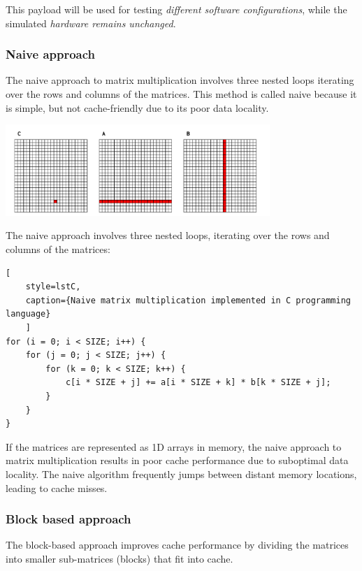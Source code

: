 \noindent This payload will be used for testing \textit{different software configurations}, while the simulated \textit{hardware remains unchanged}.

\subsubsection*{Naive approach} \label{sec:mmnaive}
The naive approach to matrix multiplication involves three nested loops iterating over the rows and columns of the matrices. This method is called naive because it is simple, but not cache-friendly
due to its poor data locality.

\begin{center}
	\centering
	\includegraphics[width=0.75\textwidth]{figures/05-analysis/mm_naive.pdf}
	\label{fig:mm_naive}
\end{center}

The naive approach involves three nested loops, iterating over the rows and columns of the matrices:

\begin{center}
\centering
\begin{minipage}{\linewidth}
\begin{lstlisting}[
	style=lstC,
    caption={Naive matrix multiplication implemented in C programming language}
    ]
for (i = 0; i < SIZE; i++) {
	for (j = 0; j < SIZE; j++) {
		for (k = 0; k < SIZE; k++) {
			c[i * SIZE + j] += a[i * SIZE + k] * b[k * SIZE + j];
		}
	}
}
\end{lstlisting}
\end{minipage}
\end{center}

\noindent If the matrices are represented as 1D arrays in memory, the naive approach to matrix multiplication results in poor cache performance due to suboptimal data locality.
The naive algorithm frequently jumps between distant memory locations, leading to cache misses.

\subsubsection*{Block based approach} \label{sec:mmblock}
The block-based approach improves cache performance by dividing the matrices into smaller sub-matrices (blocks) that fit into cache.


